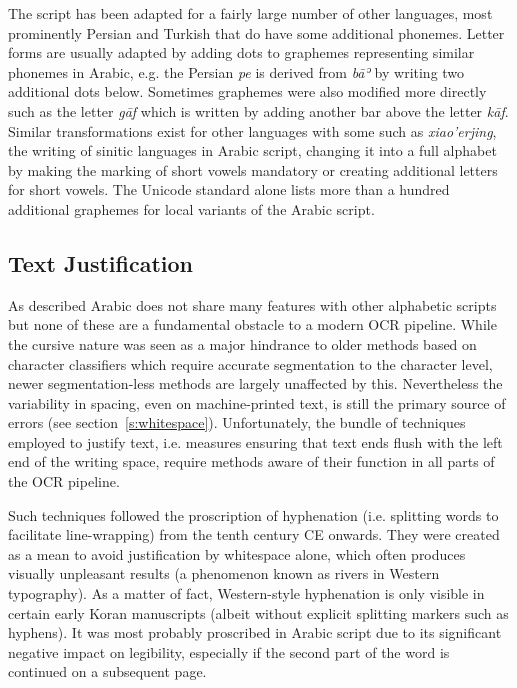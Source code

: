 The script has been adapted for a fairly large number of other languages, most
prominently Persian and Turkish that do have some additional phonemes. Letter
forms are usually adapted by adding dots to graphemes representing similar
phonemes in Arabic, e.g. the Persian \emph{pe} is derived from \emph{bāʾ} by
writing two additional dots below. Sometimes graphemes were also modified more
directly such as the letter \emph{gāf} which is written by adding another bar
above the letter \emph{kāf}. Similar transformations exist for other languages
with some such as \emph{xiao'erjing}, the writing of sinitic languages in
Arabic script, changing it into a full alphabet by making the marking of short
vowels mandatory or creating additional letters for short vowels. The Unicode
standard alone lists more than a hundred additional graphemes for local
variants of the Arabic script.

\subsection{Text Justification}

As described Arabic does not share many features with other alphabetic scripts
but none of these are a fundamental obstacle to a modern OCR pipeline.  While
the cursive nature was seen as a major hindrance to older methods based on
character classifiers which require accurate segmentation to the character
level, newer segmentation-less methods are largely unaffected by this.
Nevertheless the variability in spacing, even on machine-printed text, is still
the primary source of errors (see section~\ref{s:whitespace}). Unfortunately,
the bundle of techniques employed to justify text, i.e. measures ensuring that
text ends flush with the left end of the writing space, require methods aware
of their function in all parts of the OCR pipeline.

Such techniques followed the proscription of hyphenation (i.e. splitting words
to facilitate line-wrapping) from the tenth century CE onwards. They were
created as a mean to avoid justification by whitespace alone, which often
produces visually unpleasant results (a phenomenon known as rivers in Western
typography). As a matter of fact, Western-style hyphenation is only visible in
certain early Koran manuscripts (albeit without explicit splitting markers such
as hyphens). It was most probably proscribed in Arabic script due to its
significant negative impact on legibility, especially if the second part of the
word is continued on a subsequent page.

